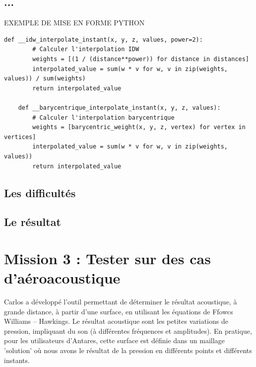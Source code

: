 \subsection{...}

EXEMPLE DE MISE EN FORME PYTHON
\begin{lstlisting}[caption=Calcul de l'interpolation, label={lst:interpolation}]
    def __idw_interpolate_instant(x, y, z, values, power=2):
        # Calculer l'interpolation IDW
        weights = [(1 / (distance**power)) for distance in distances]
        interpolated_value = sum(w * v for w, v in zip(weights, values)) / sum(weights)
        return interpolated_value
    
    def __barycentrique_interpolate_instant(x, y, z, values):
        # Calculer l'interpolation barycentrique
        weights = [barycentric_weight(x, y, z, vertex) for vertex in vertices]
        interpolated_value = sum(w * v for w, v in zip(weights, values))
        return interpolated_value
\end{lstlisting}


\subsection{Les difficultés}
\subsection{Le résultat}



\section{Mission 3 : Tester sur des cas d'aéroacoustique}
Carlos a développé l'outil permettant de déterminer le résultat acoustique, à grande distance, à partir d'une surface, en utilisant les équations de Ffowcs Williams – Hawkings. Le résultat acoustique sont les petites variations de pression, impliquant du son (à différentes fréquences et amplitudes). En pratique, pour les utilisateurs d'Antares, cette surface est définie dans un maillage 'solution' où nous avons le résultat de la pression en différents points et différents instants.
